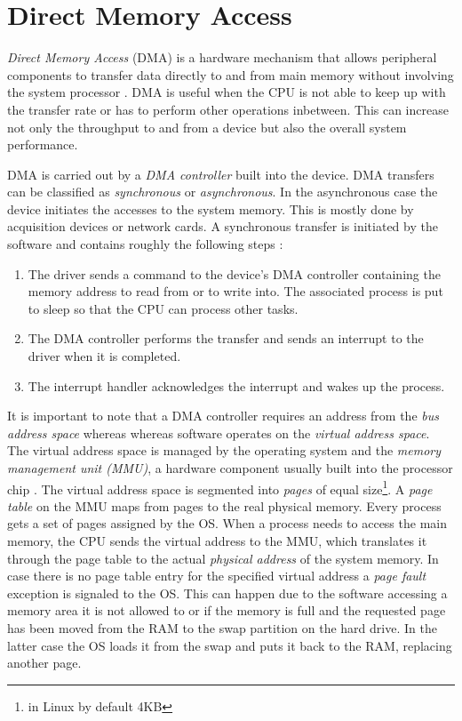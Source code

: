 

\section{Direct Memory Access}

\emph{Direct Memory Access} (DMA) is a hardware mechanism that allows peripheral components to transfer data directly to and from main memory without involving the system processor \cite{ldd}.
DMA is useful when the CPU is not able to keep up with the transfer rate or has to perform other operations inbetween. This can increase not only the throughput to and from a device but also the overall system performance.

DMA is carried out by a \emph{DMA controller} built into the device.
DMA transfers can be classified as \emph{synchronous} or \emph{asynchronous}. 
In the asynchronous case the device initiates the accesses to the system memory.
This is mostly done by acquisition devices or network cards.
A synchronous transfer is initiated by the software and contains roughly the following steps \cite{ldd}:
\begin{enumerate}
	\item The driver sends a command to the device's DMA controller containing the memory address to read from or to write into. The associated process is put to sleep so that the CPU can process other tasks.
	\item The DMA controller performs the transfer and sends an interrupt to the driver when it is completed.
	\item The interrupt handler acknowledges the interrupt and wakes up the process.
\end{enumerate}


It is important to note that a DMA controller requires an address from the \emph{bus address space} whereas whereas software operates on the \emph{virtual address space}.
The virtual address space is managed by the operating system and the \emph{memory management unit (MMU)}, a hardware component usually built into the processor chip \cite{tanenbaum}.
The virtual address space is segmented into \emph{pages} of equal size\footnote{in Linux by default 4KB}.
A \emph{page table} on the MMU maps from pages to the real physical memory.
Every process gets a set of pages assigned by the OS.
When a process needs to access the main memory, the CPU sends the virtual address to the MMU, which translates it through the page table to the actual \emph{physical address} of the system memory.
In case there is no page table entry for the specified virtual address a \emph{page fault} exception is signaled to the OS.
This can happen due to the software accessing a memory area it is not allowed to or if the memory is full and the requested page has been moved from the RAM to the swap partition on the hard drive.
In the latter case the OS loads it from the swap and puts it back to the RAM, replacing another page.


